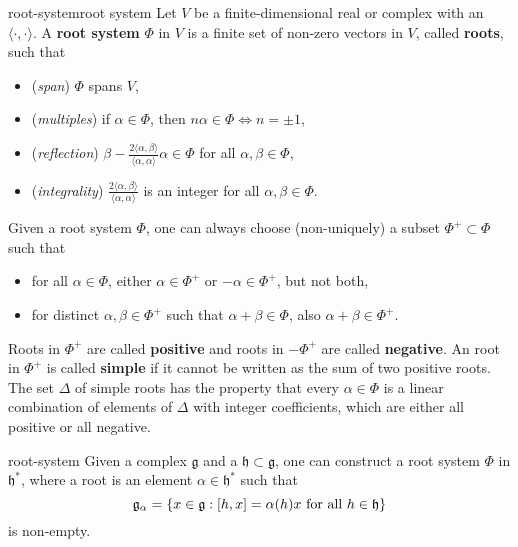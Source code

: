 \begin{topic}{root-system}{root system}
    Let $V$ be a finite-dimensional real or complex  with an  $\langle \cdot, \cdot \rangle$. A \textbf{root system} $\Phi$ in $V$ is a finite set of non-zero vectors in $V$, called \textbf{roots}, such that
    \begin{itemize}
        \item (\textit{span}) $\Phi$ spans $V$,
        \item (\textit{multiples}) if $\alpha \in \Phi$, then $n \alpha \in \Phi \iff n = \pm 1$,
        \item (\textit{reflection}) $\beta - \frac{2 \langle \alpha, \beta \rangle}{\langle \alpha, \alpha \rangle} \alpha \in \Phi$ for all $\alpha, \beta \in \Phi$,
        \item (\textit{integrality}) $\frac{2 \langle \alpha, \beta \rangle}{\langle \alpha, \alpha \rangle}$ is an integer for all $\alpha, \beta \in \Phi$.
    \end{itemize}
    Given a root system $\Phi$, one can always choose (non-uniquely) a subset $\Phi^+ \subset \Phi$ such that
    \begin{itemize}
        \item for all $\alpha \in \Phi$, either $\alpha \in \Phi^+$ or $-\alpha \in \Phi^+$, but not both,
        \item for distinct $\alpha, \beta \in \Phi^+$ such that $\alpha + \beta \in \Phi$, also $\alpha + \beta \in \Phi^+$.
    \end{itemize}
    Roots in $\Phi^+$ are called \textbf{positive} and roots in $-\Phi^+$ are called \textbf{negative}. An root in $\Phi^+$ is called \textbf{simple} if it cannot be written as the sum of two positive roots. The set $\Delta$ of simple roots has the property that every $\alpha \in \Phi$ is a linear combination of elements of $\Delta$ with integer coefficients, which are either all positive or all negative.
\end{topic}

\begin{example}{root-system}
    Given a complex  $\mathfrak{g}$ and a  $\mathfrak{h} \subset \mathfrak{g}$, one can construct a root system $\Phi$ in $\mathfrak{h}^*$, where a root is an element $\alpha \in \mathfrak{h}^*$ such that
    \[ \mathfrak{g}_\alpha = \{ x \in \mathfrak{g} : [h, x] = \alpha(h) x \textup{ for all } h \in \mathfrak{h} \} \]
    is non-empty.
\end{example}

